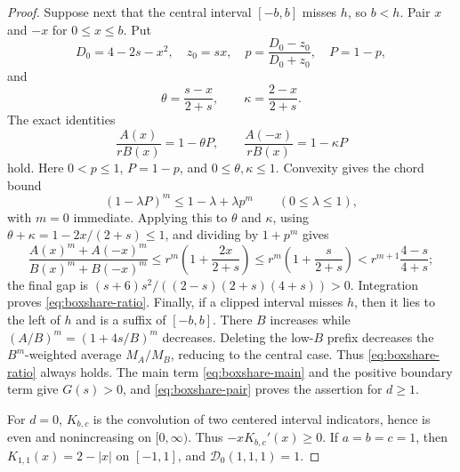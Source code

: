 \documentclass[11pt]{amsart}
\theoremstyle{definition}
\theoremstyle{remark}
\begin{document}
\begin{proof}
Suppose next that the central interval $[-b,b]$ misses $h$, so $b<h$.
Pair $x$ and $-x$ for $0\le x\le b$. Put
\[
 D_0=4-2s-x^2,\quad z_0=sx,\quad
 p=\frac{D_0-z_0}{D_0+z_0},\quad P=1-p,
\]
and
\[
 \theta=\frac{s-x}{2+s},\qquad \kappa=\frac{2-x}{2+s}.
\]
The exact identities
\[
 \frac{A(x)}{rB(x)}=1-\theta P,\qquad
 \frac{A(-x)}{rB(x)}=1-\kappa P
\]
hold. Here $0<p\le1$, $P=1-p$, and $0\le\theta,\kappa\le1$. Convexity
gives the chord bound
\[
 (1-\lambda P)^m\le1-\lambda+\lambda p^m
 \qquad(0\le\lambda\le1),
\]
with $m=0$ immediate. Applying this to $\theta$ and $\kappa$, using
$\theta+\kappa=1-2x/(2+s)\le1$, and dividing by $1+p^m$ gives
\[
 \frac{A(x)^m+A(-x)^m}{B(x)^m+B(-x)^m}
 \le r^m\left(1+\frac{2x}{2+s}\right)
 \le r^m\left(1+\frac{s}{2+s}\right)
 <r^{m+1}\frac{4-s}{4+s};
\]
the final gap is $(s+6)s^2/((2-s)(2+s)(4+s))>0$. Integration proves
\eqref{eq:boxshare-ratio}. Finally, if a clipped interval misses $h$,
then it lies to the left of $h$ and is a suffix of $[-b,b]$. There $B$
increases while $(A/B)^m=(1+4s/B)^m$ decreases. Deleting the low-$B$
prefix decreases the $B^m$-weighted average $M_A/M_B$, reducing to the
central case. Thus \eqref{eq:boxshare-ratio} always holds. The main term
\eqref{eq:boxshare-main} and the positive boundary term give $G(s)>0$,
and \eqref{eq:boxshare-pair} proves the assertion for $d\ge1$.

For $d=0$, $K_{b,c}$ is the convolution of two centered interval
indicators, hence is even and nonincreasing on $[0,\infty)$. Thus
$-xK_{b,c}'(x)\ge0$. If $a=b=c=1$, then
$K_{1,1}(x)=2-|x|$ on $[-1,1]$, and $\mathcal D_0(1,1,1)=1$.
\end{proof}
\end{document}

